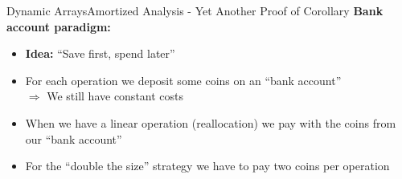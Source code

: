 

\begin{frame}{Dynamic Arrays}{Amortized Analysis -
    Yet Another Proof of Corollary}
  \textbf{Bank account paradigm:}
  \begin{itemize}
    \item
      \textbf{Idea:}
       \enquote{Save first, spend later} 
    \item
      For each operation we deposit some coins on an \enquote{bank account}\\
      $\Rightarrow$ We still have {\color{MainA}constant costs}
    \item
      When we have a {\color{MainA}linear operation} (reallocation)
      we pay with the coins from our \enquote{bank account}
    \item
      For the \enquote{double the size} strategy we have to pay
      two coins per operation
  \end{itemize}
\end{frame}

